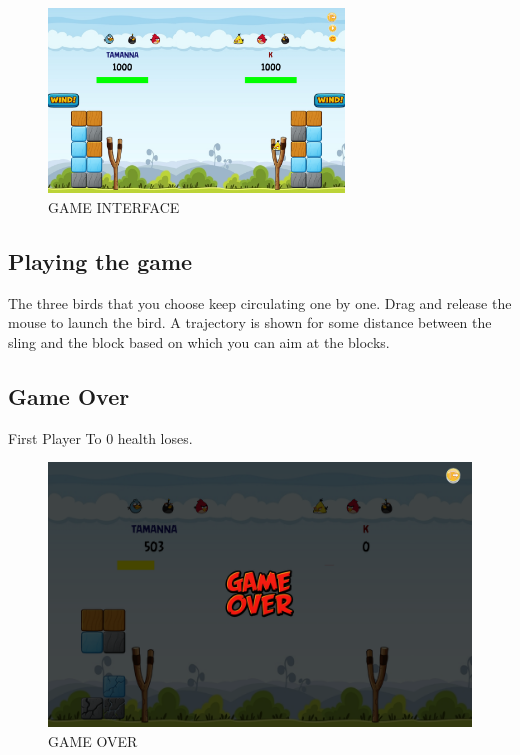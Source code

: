 \documentclass{article}
\begin{document}
\begin{figure}[h!]
    \centering
    \includegraphics[width = 0.7\textwidth]{main_game.png}
    \caption{GAME INTERFACE}
    \label{fig:GAME_INTERFACE}
\end{figure}

\subsection{Playing the game}
The three birds that you choose keep circulating one by one. Drag and release the mouse to launch the bird.
A trajectory is shown for some distance between the sling and the block based on which you can aim at the blocks.

\subsection{Game Over}

First Player To 0 health loses.
\begin{figure}[h!]
    \centering
    \includegraphics[width = \textwidth]{game_over.png}
    \caption{GAME OVER}
    \label{fig:GAME_OVER}
\end{figure}
\end{document}
